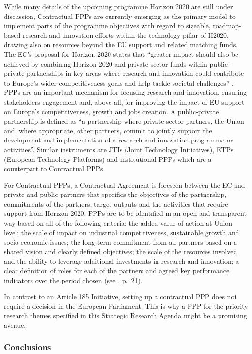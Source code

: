 \documentclass[10pt, plain]{../../metanetpaper}
\begin{document}
\begin{multicols}{2}
While many details of the upcoming programme Horizon 2020 are still under discussion, Contractual PPPs are currently emerging as the primary model to implement parts of the programme objectives with regard to sizeable, roadmap-based research and innovation efforts within the technology pillar of H2020, drawing also on resources beyond the EU support and related matching funds. The EC's proposal for Horizon 2020 states that ``greater impact should also be achieved by combining Horizon 2020 and private sector funds within public-private partnerships in key areas where research and innovation could contribute to Europe's wider competitiveness goals and help tackle societal challenges'' \cite{H2020prop}.  PPPs are an important mechanism for focusing research and innovation, ensuring stakeholders engagement and, above all, for improving the impact of EU support on Europe's competitiveness, growth and jobs creation. A public-private partnership is defined as ``a partnership where private sector partners, the Union and, where appropriate, other partners, commit to jointly support the development and implementation of a research and innovation programme or activities''. Similar instruments are JTIs (Joint Technology Initiatives), ETPs (European Technology Platforms) and institutional PPPs which are a counterpart to Contractual PPPs.

For Contractual PPPs, a Contractual Agreement is foreseen between the EC and private and public partners that specifies the objectives of the partnership, commitments of the partners, target outputs and the activities that require support from Horizon 2020. PPPs are to be identified in an open and transparent way based on all of the following criteria: the added value of action at Union level; the scale of impact on industrial competitiveness, sustainable growth and socio-economic issues; the long-term commitment from all partners based on a shared vision and clearly defined objectives; the scale of the resources involved and the ability to leverage additional investments in research and innovation; a clear definition of roles for each of the partners and agreed key performance indicators over the period chosen (see \cite{H2020prop}, p.~21).

In contrast to an Article 185 Initiative, setting up a contractual PPP does not require a decision in the European Parliament. This is why a PPP for the priority research themes specified in this Strategic Research Agenda might be a promising avenue.  

\subsubsection{Conclusions}
\label{sec:funding-conclusions}


\end{multicols}
\end{document}
